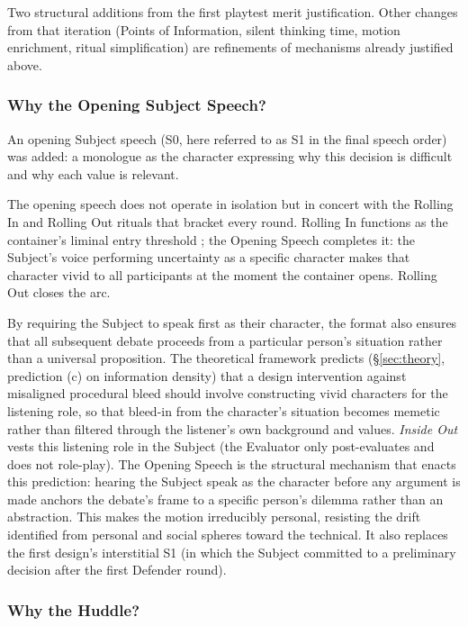 Two structural additions from the first playtest merit justification. Other changes from that iteration (Points of Information, silent thinking time, motion enrichment, ritual simplification) are refinements of mechanisms already justified above.

\subsubsection{Why the Opening Subject Speech?}

An opening Subject speech (S0, here referred to as S1 in the final speech order) was added: a monologue as the character expressing why this decision is difficult and why each value is relevant.

The opening speech does not operate in isolation but in concert with the Rolling In and Rolling Out rituals that bracket every round. Rolling In functions as the container's liminal entry threshold \parencite{bowman2025transformative}; the Opening Speech completes it: the Subject's voice performing uncertainty as a specific character makes that character vivid to all participants at the moment the container opens. Rolling Out closes the arc.

By requiring the Subject to speak first as their character, the format also ensures that all subsequent debate proceeds from a particular person's situation rather than a universal proposition. The theoretical framework predicts (§\ref{sec:theory}, prediction (c) on information density) that a design intervention against misaligned procedural bleed should involve constructing vivid characters for the listening role, so that bleed-in from the character's situation becomes memetic rather than filtered through the listener's own background and values. \emph{Inside Out} vests this listening role in the Subject (the Evaluator only post-evaluates and does not role-play). The Opening Speech is the structural mechanism that enacts this prediction: hearing the Subject speak as the character before any argument is made anchors the debate's frame to a specific person's dilemma rather than an abstraction. This makes the motion irreducibly personal, resisting the drift \textcite{goodnight1982spheres} identified from personal and social spheres toward the technical. It also replaces the first design's interstitial S1 (in which the Subject committed to a preliminary decision after the first Defender round).

\subsubsection{Why the Huddle?}

